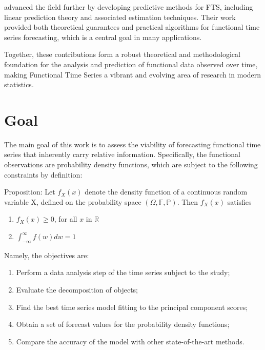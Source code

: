 \documentclass[article]{abntex2}
\begin{document}
 advanced the field further by developing predictive methods for FTS, including linear prediction theory and associated estimation techniques. Their work provided both theoretical guarantees and practical algorithms for functional time series forecasting, which is a central goal in many applications.

Together, these contributions form a robust theoretical and methodological foundation for the analysis and prediction of functional data observed over time, making Functional Time Series a vibrant and evolving area of research in modern statistics.





\section{Goal}
The main goal of this work is to assess the viability of forecasting functional time series that inherently carry relative information. Specifically, the functional observations are probability density functions, which are subject to the following constraints by definition:

Proposition: Let $f_X(x)$ denote the density function of a continuous random variable X,  defined on the probability space $(\Omega, \mathbb{F}, \mathbb{P})$. Then $f_X(x)$ satisfies
\begin{enumerate}
    \item $f_X(x)\geq0$, for all $x$ in $\mathbb{R}$
    \item $\int_{-\infty}^{\infty}f(w)dw=1$
\end{enumerate}

Namely, the objectives are:
\begin{enumerate}
    \item Perform a data analysis step of the time series subject to the study;
    \item Evaluate the decomposition of objects;
    \item Find the best time series model fitting to the principal component scores;
    \item Obtain a set of forecast values for the probability density functions;
    \item Compare the accuracy of the model with other state-of-the-art methods.
\end{enumerate}
\end{document}
